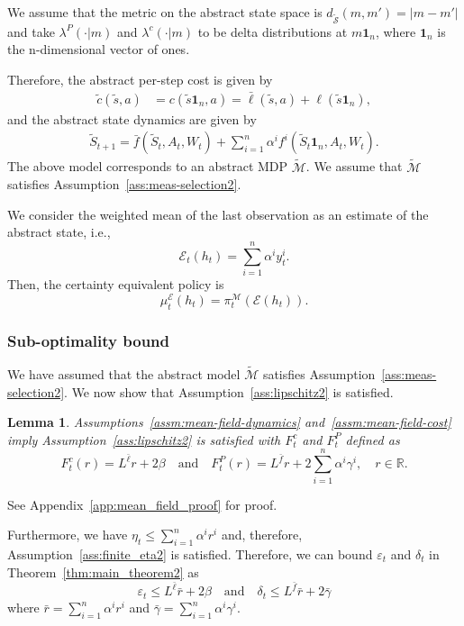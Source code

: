 \documentclass[letterpaper, 10pt]{IEEEtran}
\theoremstyle{plain}
\newtheorem{lemma}{Lemma}
\theoremstyle{nonumberplain}
\theoremstyle{plain}
\newcommand*\ALPHABET{\mathcal}
\newcommand*\ABSTRACT{\tilde}
\newcommand*\reals{\mathds{R}}
\newcommand\EST{\mathcal{E}}
\begin{document}
We assume that the metric on the abstract state space is $d_{\ABSTRACT{\ALPHABET S}}(m, m') = |m - m'|$ and take $\lambda^P(\cdot|m)$ and $\lambda^c(\cdot|m)$ to be delta distributions at $m \textbf{1}_n$, where $\mathbf{1}_n$ is the n-dimensional vector of ones.

Therefore, the abstract per-step cost is given by
\begin{align*}
    \ABSTRACT c(\ABSTRACT{s}, a) &= c(\ABSTRACT{s} \mathbf{1}_n,a) 
    = \bar \ell(\ABSTRACT{s},a) + \ell (\ABSTRACT{s} \mathbf{1}_n),
\end{align*}
and the abstract state dynamics are given by
\begin{align*}
    \ABSTRACT{S}_{t+1} = \bar f(\ABSTRACT S_t,A_t,W_t) + \sum_{i=1}^n \alpha^i f^i(\ABSTRACT S_t \mathbf{1}_n,A_t,W_t).
\end{align*}
The above model corresponds to an abstract MDP $\tilde{\ALPHABET M}$. We assume that $\tilde{\ALPHABET M}$ satisfies Assumption~\ref{ass:meas-selection2}.

We consider the weighted mean of the last observation as an estimate of the abstract state, i.e., 
\[
   \EST_t(h_t) = \sum_{i=1}^n \alpha^i y^i_t.
\]
Then, the certainty equivalent policy is
\[
    \mu_t^{\EST}(h_t) = \pi^{\ALPHABET M}_t(\EST(h_t)).
\]



\subsubsection{Sub-optimality bound}
We have assumed that the abstract model $\tilde {\ALPHABET M}$ satisfies Assumption~\ref{ass:meas-selection2}. We now show that Assumption~\ref{ass:lipschitz2} is satisfied.
\begin{lemma}\label{lem:mean_field}
Assumptions~\ref{assm:mean-field-dynamics} and~\ref{assm:mean-field-cost} imply Assumption~\ref{ass:lipschitz2} is satisfied with $F^c_t$ and $F^P_t$ defined as 
\[
    F_t^c(r) = L^{\bar \ell} r + 2\beta
    \quad\text{and}\quad
    F_t^P (r) = L^{\bar f} r + 2 \sum_{i=1}^n \alpha^i \gamma^i,
    \quad r \in \reals.
\]
\end{lemma}
See Appendix~\ref{app:mean_field_proof} for proof.


Furthermore, we have $\eta_t \le \sum_{i=1}^n \alpha^i r^i$ and, therefore, Assumption~\ref{ass:finite_eta2} is satisfied. Therefore, we can bound $\varepsilon_t$ and $\delta_t$ in Theorem~\ref{thm:main_theorem2} as
\[
   \varepsilon_t \leq L^{\bar \ell} \bar r + 2 \beta 
   \quad\text{and}\quad
   \delta_t \leq L^{\bar f} \bar r + 2 \bar \gamma
\]
where $\bar r = \sum_{i=1}^n \alpha^i r^i$ and $\bar \gamma = \sum_{i=1}^n \alpha^i \gamma^i$.
\end{document}
